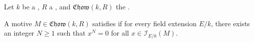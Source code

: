 \begin{definition} \label{definition:rost_nilpotence_with_bounded_exponent_for_a_motive_over_a_field_with_coefficients_in_a_commutative_ring}
Let $k$ be a , $R$ a , and $\mathfrak{Chow}(k, R)$ the .

A motive $M \in \mathfrak{Chow}(k, R)$ satisfies  if for every field extension $E/k$, there exists an integer $N \geq 1$ such that $x^N = 0$ for all $x \in \mathcal{I}_{E/k}(M)$.
\end{definition}